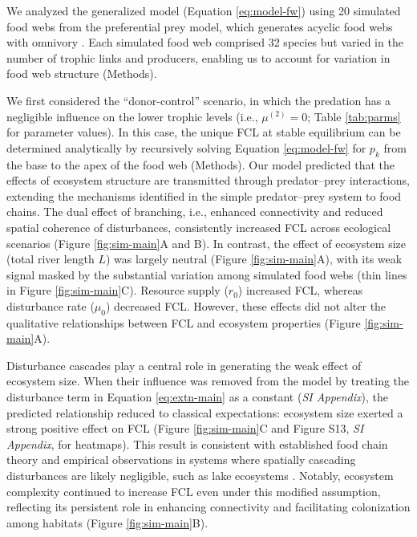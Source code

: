 \documentclass[9pt,twocolumn,twoside]{pnas-new}
\begin{document}
We analyzed the generalized model (Equation \ref{eq:model-fw}) using 20 simulated food webs from the preferential prey model, which generates acyclic food webs with omnivory \citep{shibasaki_food_2024, johnson_trophic_2014}.
Each simulated food web comprised 32 species but varied in the number of trophic links and producers, enabling us to account for variation in food web structure (Methods).

We first considered the ``donor-control'' scenario, in which the predation has a negligible influence on the lower trophic levels (i.e., $\mu^{(2)} = 0$; Table \ref{tab:parms} for parameter values).
In this case, the unique FCL at stable equilibrium can be determined analytically by recursively solving Equation \ref{eq:model-fw} for $p_k$ from the base to the apex of the food web (Methods).
Our model predicted that the effects of ecosystem structure are transmitted through predator–prey interactions, extending the mechanisms identified in the simple predator–prey system to food chains. 
The dual effect of branching, i.e., enhanced connectivity and reduced spatial coherence of disturbances, consistently increased FCL across ecological scenarios (Figure \ref{fig:sim-main}A and B). 
In contrast, the effect of ecosystem size (total river length $L$) was largely neutral (Figure \ref{fig:sim-main}A), with its weak signal masked by the substantial variation among simulated food webs (thin lines in Figure \ref{fig:sim-main}C).
Resource supply ($r_0$) increased FCL, whereas disturbance rate ($\mu_0$) decreased FCL.
However, these effects did not alter the qualitative relationships between FCL and ecosystem properties (Figure \ref{fig:sim-main}A).

Disturbance cascades play a central role in generating the weak effect of ecosystem size. 
When their influence was removed from the model by treating the disturbance term in Equation \ref{eq:extn-main} as a constant (\textit{SI Appendix}), the predicted relationship reduced to classical expectations: ecosystem size exerted a strong positive effect on FCL (Figure \ref{fig:sim-main}C and Figure S13, \textit{SI Appendix}, for heatmaps).
This result is consistent with established food chain theory \citep{holt_food_2002, takimoto_effects_2012, terui_spatial_2019} and empirical observations in systems where spatially cascading disturbances are likely negligible, such as lake ecosystems \citep{post_ecosystem_2000, takimoto_ecosystem_2008, doi_resource_2009}.
Notably, ecosystem complexity continued to increase FCL even under this modified assumption, reflecting its persistent role in enhancing connectivity and facilitating colonization among habitats (Figure \ref{fig:sim-main}B).
\end{document}
